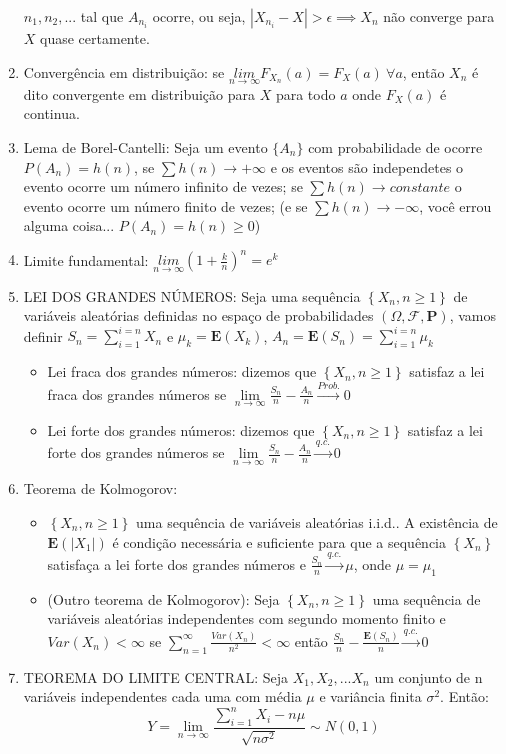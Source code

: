 \documentclass[portuguese]{article}
\begin{document}
\begin{enumerate}
$n_{1},n_{2},...$ tal que $A_{n_{i}}$ ocorre, ou seja, $|X_{n_{i}}-X|>\epsilon\implies X_{n}$
não converge para $X$ quase certamente.
\item Convergência em distribuição: se $\underset{n\rightarrow\infty}{lim}F_{X_{n}}(a)=F_{X}(a)\ \forall a$,
então $X_{n}$ é dito convergente em distribuição para $X$ para todo
$a$ onde $F_{X}(a)$ é continua.
\item Lema de Borel-Cantelli: Seja um evento $\{A_{n}\}$ com probabilidade
de ocorre $P(A_{n})=h(n)$, se $\sum h(n)\rightarrow+\infty$ e os
eventos são independetes o evento ocorre um número infinito de vezes;
se $\sum h(n)\rightarrow constante$ o evento ocorre um número finito
de vezes; (e se $\sum h(n)\rightarrow-\infty$, você errou alguma
coisa... $P(A_{n})=h(n)\ge0$)
\item Limite fundamental: $\underset{n\rightarrow\infty}{lim}(1+\frac{k}{n})^{n}=e^{k}$
\item LEI DOS GRANDES NÚMEROS: Seja uma sequência $\left\{ X_{n},n\ge1\right\} $
de variáveis aleatórias definidas no espaço de probabilidades $(\Omega,\mathcal{F},\mathbf{P})$,
vamos definir $S_{n}=\sum_{i=1}^{i=n}X_{n}$ e $\mu_{k}=\mathbf{E}(X_{k})$,
$A_{n}=\mathbf{E}(S_{n})=\sum_{i=1}^{i=n}\mu_{k}$

\begin{itemize}
\item Lei fraca dos grandes números: dizemos que $\left\{ X_{n},n\ge1\right\} $
satisfaz a lei fraca dos grandes números se $\underset{n\rightarrow\infty}{\lim}\frac{S_{n}}{n}-\frac{A_{n}}{n}\overset{Prob.}{\to}0$
\item Lei forte dos grandes números: dizemos que $\left\{ X_{n},n\ge1\right\} $
satisfaz a lei forte dos grandes números se $\underset{n\rightarrow\infty}{\lim}\frac{S_{n}}{n}-\frac{A_{n}}{n}\overset{q.c.}{\to}0$
\end{itemize}
\item Teorema de Kolmogorov: 

\begin{itemize}
\item $\left\{ X_{n},n\ge1\right\} $ uma sequência de variáveis aleatórias
i.i.d.. A existência de $\mathbf{E}(\left|X_{1}\right|)$ é condição
necessária e suficiente para que a sequência $\left\{ X_{n}\right\} $
satisfaça a lei forte dos grandes números e $\frac{S_{n}}{n}\overset{q.c.}{\to}\mu$,
onde $\mu=\mu_{1}$
\item (Outro teorema de Kolmogorov): Seja $\left\{ X_{n},n\ge1\right\} $
uma sequência de variáveis aleatórias independentes com segundo momento
finito e $Var(X_{n})<\infty$ se $\sum_{n=1}^{\infty}\frac{Var(X_{n})}{n^{2}}<\infty$
então $\frac{S_{n}}{n}-\frac{\mathbf{E}(S_{n})}{n}\overset{q.c.}{\to}0$
\end{itemize}
\item TEOREMA DO LIMITE CENTRAL: Seja $X_{1},X_{2},...X_{n}$ um conjunto
de n variáveis independentes cada uma com média $\mu$ e variância
finita $\sigma^{2}$. Então:
\[
Y=\underset{n\to\infty}{\lim}\frac{\sum_{i=1}^{n}X_{i}-n\mu}{\sqrt{n\sigma^{2}}}\sim N(0,1)
\]




\end{enumerate}
\end{document}
